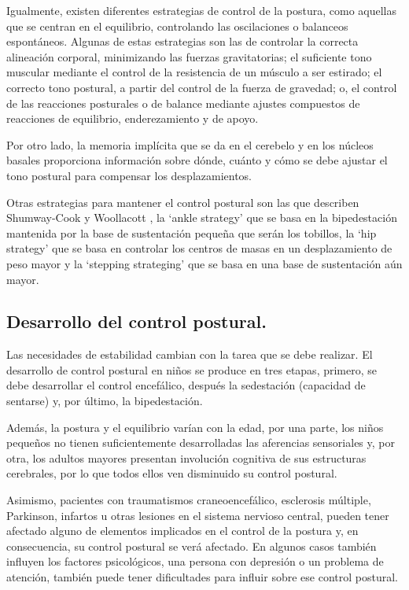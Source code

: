 Igualmente, existen diferentes estrategias de control de la postura, como aquellas que se centran en el equilibrio, controlando las oscilaciones o balanceos espontáneos. Algunas de estas estrategias son las de controlar la correcta alineación corporal, minimizando las fuerzas gravitatorias; el suficiente tono muscular mediante el control de la resistencia de un músculo a ser estirado; el correcto tono postural, a partir del control de la fuerza de gravedad; o, el control de las reacciones posturales o de balance mediante ajustes compuestos de reacciones de equilibrio, enderezamiento y de apoyo. 

Por otro lado, la memoria implícita que se da en el cerebelo y en los núcleos basales proporciona información sobre dónde, cuánto y cómo se debe ajustar el tono postural para compensar los desplazamientos.

Otras estrategias para mantener el control postural son las que describen Shumway-Cook y Woollacott \cite{shumwayYWoollacott}, la ‘ankle strategy’ que se basa en la bipedestación mantenida por la base de sustentación pequeña que serán los tobillos, la ‘hip strategy’ que se basa en controlar los centros de masas en un desplazamiento de peso mayor y la ‘stepping strateging’ que se basa en una base de sustentación aún mayor.

\subsection{Desarrollo del control postural.} 
Las necesidades de estabilidad cambian con la tarea que se debe realizar. El desarrollo de control postural en niños se produce en tres etapas, primero, se debe desarrollar el control encefálico, después la sedestación (capacidad de sentarse) y, por último, la bipedestación.

Además, la postura y el equilibrio varían con la edad, por una parte, los niños pequeños\cite{Libro3_pediatria} no tienen suficientemente desarrolladas las aferencias sensoriales y, por otra, los adultos mayores\cite{Libro4_mayores} presentan involución cognitiva de sus estructuras cerebrales, por lo que todos ellos ven disminuido su control postural.

Asimismo, pacientes con traumatismos craneoencefálico, esclerosis múltiple, Parkinson, infartos u otras lesiones en el sistema nervioso central, pueden tener afectado alguno de elementos implicados en el control de la postura y, en consecuencia, su control postural se verá afectado. En algunos casos también influyen los factores psicológicos, una persona con depresión o un problema de atención, también puede tener dificultades para influir sobre ese control postural.


